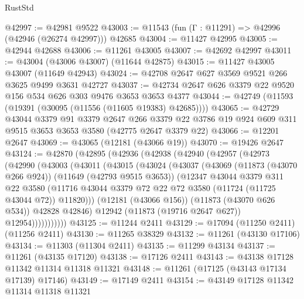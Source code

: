 \begin{lexlean}{RustStd}
\begin{coremodule}
@42997 := @42981 @9522
@43003 := @11543 (fun (Γ : @11291) => @42996 (@42946 (@26274 @42997))) @42685
@43004 := @11427 @42995
@43005 := @42944 @42688
@43006 := @11261 @43005
@43007 := @42692 @42997
@43011 := @43004 (@43006 @43007) (@11644 @42875)
@43015 := @11427 @43005 @43007 (@11649 @42943)
@43024 := @42708 @2647 @627 @3569 @9521 @266 @3625 @9499 @3631 @42727
@43037 := @42734 @2647 @626 @3379 @22 @9520 @156 @534 @626 @303 @9476 @3653 @3653 @4377
@43044 := @42749 (@11593 (@19391 (@30095 (@11556 (@11605 @19383) @42685))))
@43065 := @42729
    @43044
    @3379
    @91
    @3379
    @2647
    @266
    @3379
    @22
    @3786
    @19
    @924
    @609
    @311
    @9515
    @3653
    @3653
    @3580
    (@42775 @2647 @3379 @22)
@43066 := @12201 @2647
@43069 := @43065 (@12181 (@43066 @19))
@43070 := @19426 @2647
@43124 := @42870
    (@42895
      (@42936
        (@42938
          (@42940
            (@42957
              (@42973
                (@42990
                  (@43003
                    (@43011
                      (@43015
                        (@43024
                          (@43037
                            (@43069
                              (@11873 (@43070 @266 @924))
                              (@11649 (@42793 @9515 @3653))
                              (@12347
                                @43044
                                @3379
                                @311
                                @22
                                @3580
                                (@11716
                                  @43044
                                  @3379
                                  @72
                                  @22
                                  @72
                                  @3580
                                  (@11724 (@11725 @43044 @72))
                                  @11820)))
                            (@12181 (@43066 @156))
                            (@11873 (@43070 @626 @534))
                            @42828
                            @42846)
                          @12942
                          (@11873 (@19716 @2647 @627))
                          @12954)))))))))))
@43125 := @11244 @2411
@43129 := @17094 (@11250 @2411) (@11256 @2411)
@43130 := @11265 @38329
@43132 := @11261 (@43130 @17106)
@43134 := @11303 (@11304 @2411)
@43135 := @11299 @43134
@43137 := @11261 (@43135 @17120)
@43138 := @17126 @2411
@43143 := @43138 @17128 @11342 @11314 @11318 @11321
@43148 := @11261 (@17125 (@43143 @17134 @17139) @17146)
@43149 := @17149 @2411
@43154 := @43149 @17128 @11342 @11314 @11318 @11321

\end{coremodule}
\end{lexlean}
